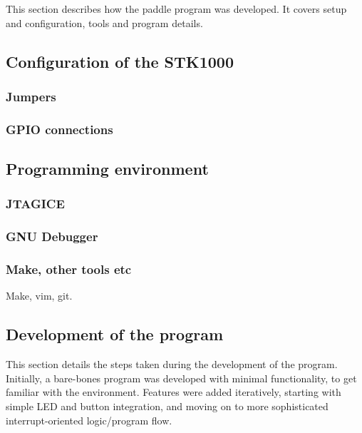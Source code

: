 This section describes how the paddle program was developed.
It covers setup and configuration, tools and program details.

\subsection{Configuration of the STK1000}

    \subsubsection{Jumpers}

        

    \subsubsection{GPIO connections}

        

\subsection{Programming environment}

    \subsubsection{JTAGICE}

        

    \subsubsection{GNU Debugger}
        

    \subsubsection{Make, other tools etc}

    Make, vim, git.

\subsection{Development of the program}

This section details the steps taken during the development of the program.
Initially, a bare-bones program was developed with minimal functionality, to get familiar with the environment.
Features were added iteratively, starting with simple LED and button integration, and moving on to more sophisticated interrupt-oriented logic/program flow.

